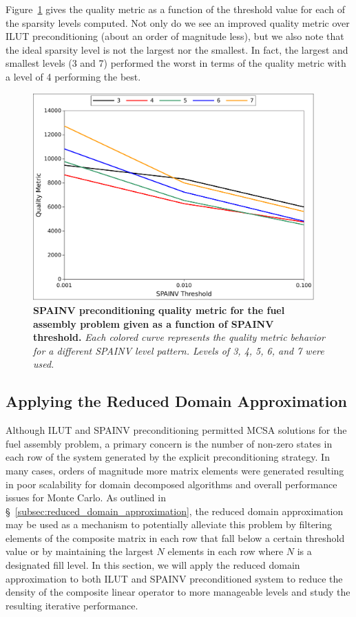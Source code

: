 Figure~\ref{fig:spainv_quality} gives the quality metric as a function
of the threshold value for each of the sparsity levels computed. Not
only do we see an improved quality metric over ILUT preconditioning
(about an order of magnitude less), but we also note that the ideal
sparsity level is not the largest nor the smallest. In fact, the
largest and smallest levels (3 and 7) performed the worst in terms of
the quality metric with a level of 4 performing the best.

\begin{figure}[t!]
  \begin{center}
    \includegraphics[width=4.25in]{chapters/spn_equations/spainv_quality.pdf}
  \end{center}
  \caption{\textbf{SPAINV preconditioning quality metric for the fuel
      assembly problem given as a function of SPAINV threshold.}
    \textit{Each colored curve represents the quality metric behavior
      for a different SPAINV level pattern. Levels of 3, 4, 5, 6, and
      7 were used.}}
  \label{fig:spainv_quality}
\end{figure}

\clearpage

\subsection{Applying the Reduced Domain Approximation}
\label{subsec:spn_prec_rda}
Although ILUT and SPAINV preconditioning permitted MCSA solutions for
the fuel assembly problem, a primary concern is the number of non-zero
states in each row of the system generated by the explicit
preconditioning strategy. In many cases, orders of magnitude more
matrix elements were generated resulting in poor scalability for
domain decomposed algorithms and overall performance issues for Monte
Carlo. As outlined in \S~\ref{subsec:reduced_domain_approximation},
the reduced domain approximation may be used as a mechanism to
potentially alleviate this problem by filtering elements of the
composite matrix in each row that fall below a certain threshold value
or by maintaining the largest $N$ elements in each row where $N$ is a
designated fill level. In this section, we will apply the reduced
domain approximation to both ILUT and SPAINV preconditioned system to
reduce the density of the composite linear operator to more manageable
levels and study the resulting iterative performance.

